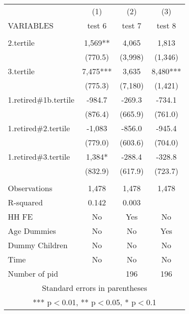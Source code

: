 \begin{tabular}{lccc} \hline
 & (1) & (2) & (3) \\
VARIABLES & test 6 & test 7 & test 8 \\ \hline
 &  &  &  \\
2.tertile & 1,569** & 4,065 & 1,813 \\
 & (770.5) & (3,998) & (1,346) \\
3.tertile & 7,475*** & 3,635 & 8,480*** \\
 & (775.3) & (7,180) & (1,421) \\
1.retired\#1b.tertile & -984.7 & -269.3 & -734.1 \\
 & (876.4) & (665.9) & (761.0) \\
1.retired\#2.tertile & -1,083 & -856.0 & -945.4 \\
 & (779.0) & (603.6) & (704.0) \\
1.retired\#3.tertile & 1,384* & -288.4 & -328.8 \\
 & (832.9) & (617.9) & (723.7) \\
 &  &  &  \\
Observations & 1,478 & 1,478 & 1,478 \\
R-squared & 0.142 & 0.003 &  \\
HH FE & No & Yes & No \\
Age Dummies & No & No & Yes \\
Dummy Children & No & No & No \\
Time & No & No & No \\
 Number of pid &  & 196 & 196 \\ \hline
\multicolumn{4}{c}{ Standard errors in parentheses} \\
\multicolumn{4}{c}{ *** p$<$0.01, ** p$<$0.05, * p$<$0.1} \\
\end{tabular}
